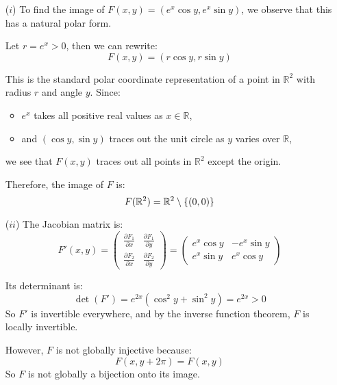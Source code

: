 \documentclass{report}
\begin{document}
\begin{itemize}
  \item[(\(i\))] 
 To find the image of \(F(x, y) = (e^x \cos y, e^x \sin y)\), we observe that this has a natural polar form.

Let \(r = e^x > 0\), then we can rewrite:
\[
F(x, y) = (r \cos y, r \sin y)
\]

This is the standard polar coordinate representation of a point in \(\mathbb{R}^2\) with radius \(r\) and angle \(y\). Since:
\begin{itemize}
  \item \(e^x\) takes all positive real values as \(x \in \mathbb{R}\),
  \item and \((\cos y, \sin y)\) traces out the unit circle as \(y\) varies over \(\mathbb{R}\),
\end{itemize}
we see that \(F(x, y)\) traces out all points in \(\mathbb{R}^2\) except the origin.

Therefore, the image of \(F\) is:
\[
  F(\mathbb{R}^2) = \mathbb{R}^2 \setminus \{(0,0)\}
\]  \item[(\(ii\))] The Jacobian matrix is:
  \[
  F'(x,y) = 
  \begin{pmatrix}
    \frac{\partial F_1}{\partial x} & \frac{\partial F_1}{\partial y} \\
    \frac{\partial F_2}{\partial x} & \frac{\partial F_2}{\partial y}
  \end{pmatrix}
  =
  \begin{pmatrix}
    e^x \cos y & -e^x \sin y \\
    e^x \sin y & e^x \cos y
  \end{pmatrix}
  \]

  Its determinant is:
  \[
  \det(F') = e^{2x} (\cos^2 y + \sin^2 y) = e^{2x} > 0
  \]
  So \(F'\) is invertible everywhere, and by the inverse function theorem, \(F\) is locally invertible.

  However, \(F\) is not globally injective because:
  \[
  F(x, y + 2\pi) = F(x, y)
  \]
  So \(F\) is not globally a bijection onto its image.
\end{itemize}
\end{document}
